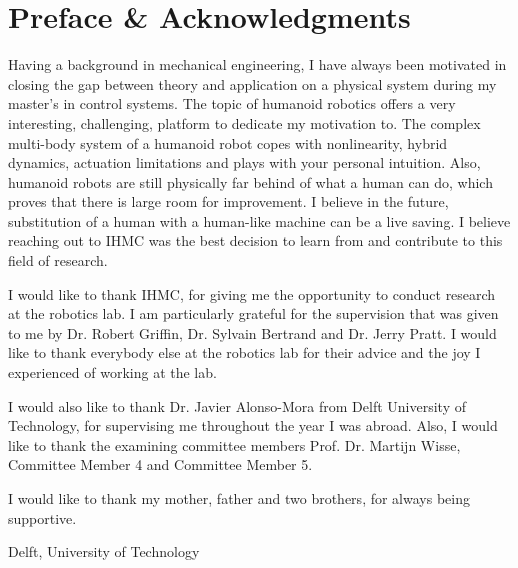 %
\chapter{Preface \& Acknowledgments}%
Having a background in mechanical engineering, I have always been motivated in closing the gap between theory and application on a physical system during my master's in control systems. The topic of humanoid robotics offers a very interesting, challenging, platform to dedicate my motivation to. The complex multi-body system of a humanoid robot copes with nonlinearity, hybrid dynamics, actuation limitations and plays with your personal intuition. Also, humanoid robots are still physically far behind of what a human can do, which proves that there is large room for improvement. I believe in the future, substitution of a human with a human-like machine can be a live saving. I believe reaching out to \ac{IHMC} was the best decision to learn from and contribute to this field of research.

I would like to thank \ac{IHMC}, for giving me the opportunity to conduct research at the robotics lab. I am particularly grateful for the supervision that was given to me by Dr. Robert Griffin, Dr. Sylvain Bertrand and Dr. Jerry Pratt. I would like to thank everybody else at the robotics lab for their advice and the joy I experienced of working at the lab. 

I would also like to thank Dr. Javier Alonso-Mora from Delft University of Technology, for supervising me throughout the year I was abroad. Also, I would like to thank the examining committee members Prof. Dr. Martijn Wisse, Committee Member 4 and Committee Member 5.

I would like to thank my mother, father and two brothers, for always being supportive.

\vspace*{15mm}

Delft, University of Technology \hfill \mscname \\
\mscdate